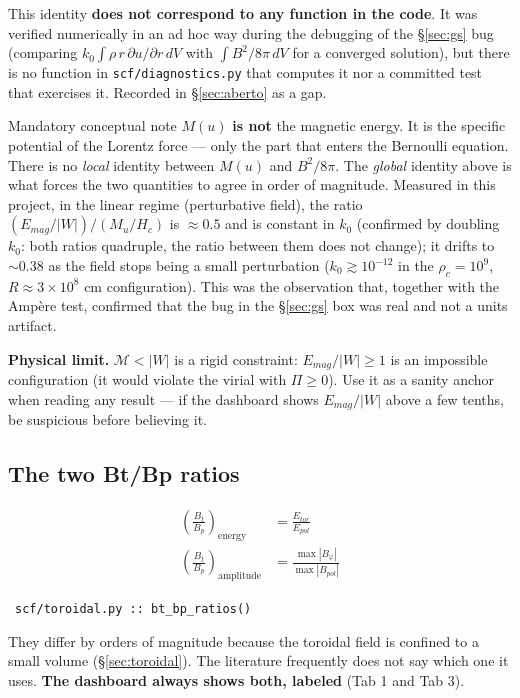 \documentclass[11pt,a4paper]{scrartcl}
\newcommand{\arrowto}[1]{%
  \par\vspace{2pt}\noindent{\color{linkblue}$\rightarrow$}~\texttt{\small #1}\par\vspace{2pt}}
\newcommand{\code}[1]{\texttt{\small #1}}
\begin{document}
This identity \textbf{does not correspond to any function in the code}.
It was verified numerically in an ad hoc way during the debugging of the
\S\ref{sec:gs} bug (comparing $k_0\int\rho\,r\,\partial u/\partial r\,dV$
with $\int B^2/8\pi\,dV$ for a converged solution), but there is no
function in \code{scf/diagnostics.py} that computes it nor a committed
test that exercises it. Recorded in \S\ref{sec:aberto} as a gap.

\begin{notebox}{Mandatory conceptual note}
$M(u)$ \textbf{is not} the magnetic energy. It is the specific potential
of the Lorentz force --- only the part that enters the Bernoulli
equation. There is no \emph{local} identity between $M(u)$ and
$B^2/8\pi$. The \emph{global} identity above is what forces the two
quantities to agree in order of magnitude. Measured in this project, in
the linear regime (perturbative field), the ratio
$(E_{mag}/|W|)/(M_u/H_c)$ is $\approx0.5$ and is constant in $k_0$
(confirmed by doubling $k_0$: both ratios quadruple, the ratio between
them does not change); it drifts to $\sim0.38$ as the field stops being
a small perturbation ($k_0\gtrsim10^{-12}$ in the $\rho_c=10^9$,
$R\approx3\times10^8$ cm configuration). This was the observation that,
together with the Ampère test, confirmed that the bug in the
\S\ref{sec:gs} box was real and not a units artifact.
\end{notebox}

\textbf{Physical limit.} $\mathcal{M}<|W|$ is a rigid constraint:
$E_{mag}/|W|\ge1$ is an impossible configuration (it would violate the
virial with $\Pi\ge0$). Use it as a sanity anchor when reading any
result --- if the dashboard shows $E_{mag}/|W|$ above a few tenths, be
suspicious before believing it.

\subsection{The two Bt/Bp ratios}

\begin{align}
\left(\frac{B_t}{B_p}\right)_{\text{energy}} &= \frac{E_{tor}}{E_{pol}}\\
\left(\frac{B_t}{B_p}\right)_{\text{amplitude}} &= \frac{\max|B_\varphi|}{\max|B_{pol}|}
\end{align}

\arrowto{scf/toroidal.py :: bt\_bp\_ratios()}

They differ by orders of magnitude because the toroidal field is confined
to a small volume (\S\ref{sec:toroidal}). The literature frequently does
not say which one it uses. \textbf{The dashboard always shows both,
labeled} (Tab 1 and Tab 3).
\end{document}
